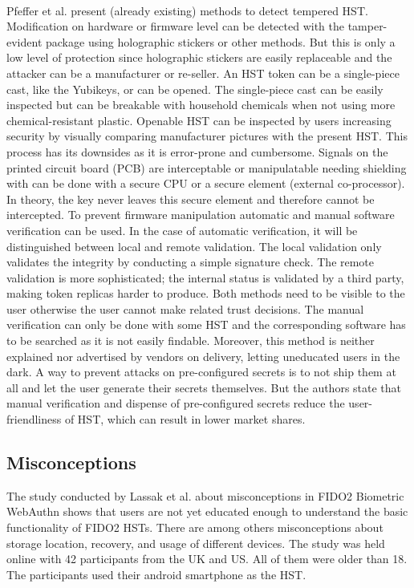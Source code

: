 \documentclass[runningheads]{llncs}
\begin{document}
\paragraph{}
Pfeffer et al. present (already existing) methods to detect tempered HST.
Modification on hardware or firmware level can be detected with the tamper-evident package using holographic stickers or other methods. But this is only a low level of protection since holographic stickers are easily replaceable and the attacker can be a manufacturer or re-seller. An HST token can be a single-piece cast, like the Yubikeys, or can be opened. The single-piece cast can be easily inspected but can be breakable with household chemicals when not using more chemical-resistant plastic. Openable HST can be inspected by users increasing security by visually comparing manufacturer pictures with the present HST. This process has its downsides as it is error-prone and cumbersome. Signals on the printed circuit board (PCB) are interceptable or manipulatable needing shielding with can be done with a secure CPU or a secure element (external co-processor). In theory, the key never leaves this secure element and therefore cannot be intercepted. To prevent firmware manipulation automatic and manual software verification can be used. In the case of automatic verification, it will be distinguished between local and remote validation. The local validation only validates the integrity by conducting a simple signature check. The remote validation is more sophisticated; the internal status is validated by a third party, making token replicas harder to produce. Both methods need to be visible to the user otherwise the user cannot make related trust decisions.
The manual verification can only be done with some HST and the corresponding software has to be searched as it is not easily findable. Moreover, this method is neither explained nor advertised by vendors on delivery, letting uneducated users in the dark. A way to prevent attacks on pre-configured secrets is to not ship them at all and let the user generate their secrets themselves. But the authors state that manual verification and dispense of pre-configured secrets reduce the user-friendliness of HST, which can result in lower market shares. \cite{272198}

\subsection{Misconceptions}
The study conducted by Lassak et al.\cite{274547} about misconceptions in FIDO2 Biometric WebAuthn shows that users are not yet educated enough to understand the basic functionality of FIDO2 HSTs. There are among others misconceptions about storage location, recovery, and usage of different devices. The study was held online with 42 participants from the UK and US. All of them were older than 18. The participants used their android smartphone as the HST.
\end{document}
